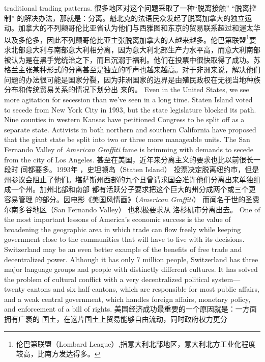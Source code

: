 \begin{paracol}{2}
traditional trading patterns.
\switchcolumn
很多地区对这个问题采取了一种“脱离接触”  “脱离控制” 的解决办法，那就是：分离。魁北克的法语民众发起了脱离加拿大的独立运动。加拿大的不列颠哥伦比亚省认为他们与西雅图和东京的贸易联系超过和渥太华以及多伦多，因此不列颠哥伦比亚主张脱离加拿大的人越来越多。伦巴第联盟\footnote{伦巴第联盟（Lombard  League）,指意大利北部地区，意大利北方工业化程度较高，比南方发达得多。}要求北部意大利与南部意大利相分离，因为意大利北部生产力水平高，而意大利南部被认为是在黑手党统治之下，而且沉溺于福利。他们在投票中很快取得了成功。苏格兰主张某种形式的分离甚至是独立的呼声也越来越高。对于非洲来说，解决他们问题的办法很可能是国家分裂，因为非洲国家的边界是由殖民政权在无视当地种族分布和传统贸易关系的情况下划分出
来的。
\switchcolumn*
Even in the United States, we see more agitation for secession than we've seen in a long time. Staten Island voted to secede from New York City in 1993, but the state legislature
blocked its path. Nine counties in western Kansas have petitioned Congress to be split off as a separate state. Activists in
both northern and southern California have proposed that the
giant state be split into two or three more manageable units.
The San Fernando Valley of \textit{American Graffiti} fame is brimming
with demands to secede from the city of Los Angeles.
\switchcolumn
甚至在美国，近年来分离主义的要求也比以前很长一段时
间都要多。1993年 ，史坦顿岛（Staten Island） 投票决定脱离纽约市，但是州参议会阻止了他们。堪萨斯州西部的九个县曾请求国会准许他们分离出来单独组成一个州。加州北部和南部
都有活跃分子要求把这个巨大的州分成两个或三个更容易管理
的部分。因电影《美国风情画》（\textit{American Graffiti}） 而闻名于世的圣费尔南多谷地区（San Fernando Valley） 也积极要求从
洛杉矶市分离出去。
\switchcolumn*
One of the most important lessons of America's economic
success is the value of broadening the geographic area in which
trade can flow freely while keeping government close to the
communities that will have to live with its decisions. Switzerland may be an even better example of the benefits of free trade
and decentralized power. Although it has only 7 million people,
Switzerland has three major language groups and people with
distinctly different cultures. It has solved the problem of cultural conflict with a very decentralized political system---
twenty cantons and six half-cantons, which are responsible for
most public affairs, and a weak central government, which handles foreign affairs, monetary policy, and enforcement of a bill
of rights.
\switchcolumn
美国经济成功最重要的一个原因就是：一方面拥有广袤的
国土，在这片国土上贸易能够自由流动，同时政府权力更分

\end{paracol}
